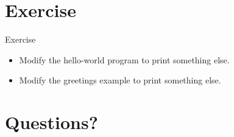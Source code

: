 \documentclass[12pt, aspectratio=169]{beamer}
\begin{document}
    \section{Exercise}

    \begin{frame}{Exercise}
        \begin{itemize}
            \item Modify the hello-world program to print something else.
            \item Modify the greetings example to print something else.
        \end{itemize}
    \end{frame}

    \section*{Questions?}
\end{document}
